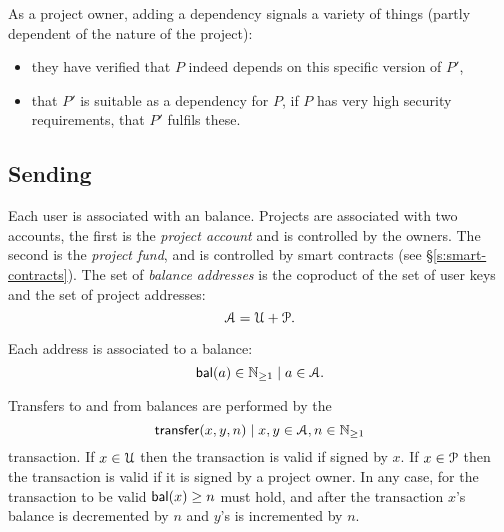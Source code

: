 As a project owner, adding a dependency signals a variety of things
(partly dependent of the nature of the project):
\begin{itemize}
\item they have verified that $P$ indeed depends on this specific
  version of $P'$,
\item that $P'$ is suitable as a dependency for $P$, \eg{} if $P$ has
  very high security requirements, that $P'$ fulfils these.
\end{itemize}

\def\posnat{\mathbb{N}_{\geq 1}}

\subsection{Sending \oscoin{}}
\label{s:sending}

Each user is associated with an \oscoin{} balance. Projects are associated with
two accounts, the first is the \emph{project account} and is controlled by the
owners. The second is the \emph{project fund}, and is controlled by smart
contracts (see \S \ref{s:smart-contracts}). The set of \emph{balance addresses}
is the coproduct of the set of user keys and the set of project addresses:
\[
    \mathcal{A} = \mathcal{U} + \mathcal{P}.
\]

Each address is associated to a balance:
\[
    \bal(a) \in \posnat \mid a \in \accAddrs.
\]

Transfers to and from balances are performed by the
\[
    \tx{transfer}{x,y,n} \mid x,y \in \accAddrs, n \in \posnat
\]
transaction. If $x \in \mathcal{U}$ then the transaction is valid if signed by
$x$. If $x \in \mathcal{P}$ then the transaction is valid if it is signed by a
project owner. In any case, for the transaction to be valid $\mathsf{bal}(x) \geq n$
must hold, and after the transaction $x$'s balance is decremented by $n$ and
$y$'s is incremented by $n$.


